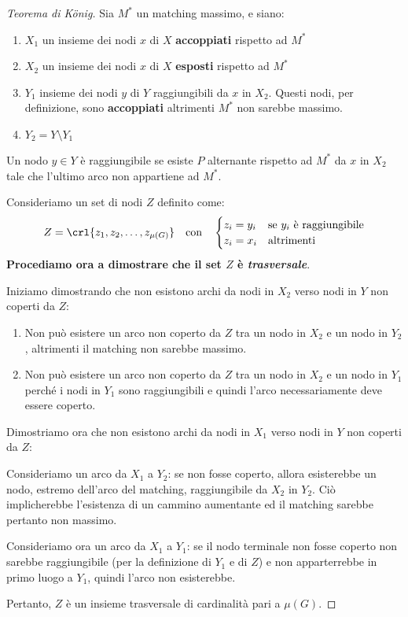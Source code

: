 \documentclass[\main/main.tex]{subfiles}
\begin{document}
\begin{proof}[Teorema di König]
  Sia \(M^*\) un matching massimo, e siano:
  \begin{enumerate}
    \item \(X_1\) un insieme dei nodi \(x\) di \(X\) \textbf{accoppiati} rispetto ad \(M^*\)
    \item \(X_2\) un insieme dei nodi \(x\) di \(X\) \textbf{esposti} rispetto ad \(M^*\)
    \item \(Y_1\) insieme dei nodi \(y\) di \(Y\) raggiungibili da \(x\) in \(X_2\). Questi nodi, per definizione, sono \textbf{accoppiati} altrimenti \(M^*\) non sarebbe massimo.
    \item \(Y_2 = Y \setminus Y_1\)
  \end{enumerate}

  \begin{definition}
    Un nodo \(y \in Y\) è raggiungibile se esiste \(P\) alternante rispetto ad \(M^*\) da \(x\) in \(X_2\) tale che l'ultimo arco non appartiene ad \(M^*\).
  \end{definition}

  Consideriamo un set di nodi \(Z\) definito come:
  \[
    Z = \crl{z_1, z_2, \ldots, z_{\mu(G)}} \quad \text{con} \quad \begin{cases}
      z_i = y_i & \text{se \(y_i\) è raggiungibile} \\
      z_i = x_i & \text{altrimenti}
    \end{cases}
  \]
  \textbf{Procediamo ora a dimostrare che il set \(Z\) è \textit{trasversale}}.

  Iniziamo dimostrando che non esistono archi da nodi in \(X_2\) verso nodi in \(Y\) non coperti da \(Z\):

  \begin{enumerate}
    \item Non può esistere un arco non coperto da \(Z\) tra un nodo in \(X_2\) e un nodo in \(Y_2\), altrimenti il matching non sarebbe massimo.
    \item Non può esistere un arco non coperto da \(Z\) tra un nodo in \(X_2\) e un nodo in \(Y_1\) perché i nodi in \(Y_1\) sono raggiungibili e quindi l'arco necessariamente deve essere coperto.
  \end{enumerate}

  Dimostriamo ora che non esistono archi da nodi in \(X_1\) verso nodi in \(Y\) non coperti da \(Z\):

  Consideriamo un arco da \(X_1\) a \(Y_2\): se non fosse coperto, allora esisterebbe un nodo, estremo dell'arco del matching, raggiungibile da \(X_2\) in \(Y_2\). Ciò implicherebbe l'esistenza di un cammino aumentante ed il matching sarebbe pertanto non massimo.

  Consideriamo ora un arco da \(X_1\) a \(Y_1\): se il nodo terminale non fosse coperto non sarebbe raggiungibile (per la definizione di \(Y_1\) e di \(Z\)) e non apparterrebbe in primo luogo a \(Y_1\), quindi l'arco non esisterebbe.

  Pertanto, \(Z\) è un insieme trasversale di cardinalità pari a \(\mu(G)\).
\end{proof}
\end{document}
